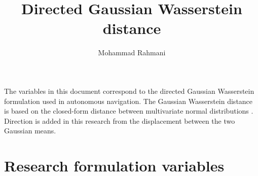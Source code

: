 \documentclass[a4paper]{article}
\title{Directed Gaussian Wasserstein distance}
\date{}
\author{Mohammad Rahmani}
\begin{document}
   \maketitle

   The variables in this document correspond to the directed Gaussian Wasserstein formulation used in autonomous navigation. The Gaussian Wasserstein distance is based on the closed-form distance between multivariate normal distributions \cite{dowson-1982-the-frechet-distance-between-multivariate-normal-distributions}. Direction is added in this research from the displacement between the two Gaussian means.

   \section{Research formulation variables}
\end{document}
